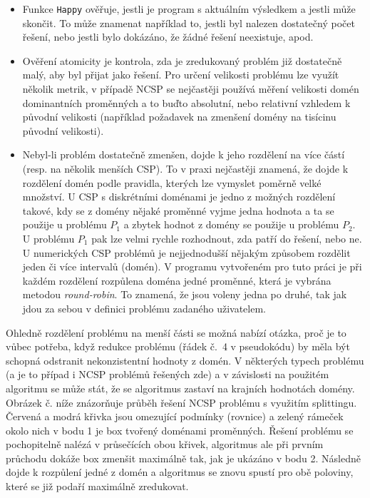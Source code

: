 \begin{itemize}
    \item Funkce \verb|Happy| ověřuje, jestli je program  s aktuálním výsledkem a jestli může skončit. To může znamenat například to, jestli byl nalezen dostatečný počet řešení, nebo jestli bylo dokázáno, že žádné řešení neexistuje, apod.
    \item Ověření atomicity je kontrola, zda je zredukovaný problém již dostatečně malý, aby byl přijat jako řešení. Pro určení velikosti problému lze využít několik metrik, v případě NCSP se nejčastěji používá měření velikosti domén dominantních proměnných a to buďto absolutní, nebo relativní vzhledem k původní velikosti (například požadavek na zmenšení domény na tisícinu původní velikosti).
    \item Nebyl-li problém dostatečně zmenšen, dojde k jeho rozdělení na více částí (resp. na několik menších CSP). To v praxi nejčastěji znamená, že dojde k rozdělení domén podle pravidla, kterých lze vymyslet poměrně velké množství. U CSP s diskrétními doménami je jedno z možných rozdělení takové, kdy se z domény nějaké proměnné vyjme jedna hodnota a ta se použije u problému $P_1$ a zbytek hodnot z domény se použije u problému $P_2$. U problému $P_1$ pak lze velmi rychle rozhodnout, zda patří do řešení, nebo ne. U numerických CSP problémů je nejjednodušší nějakým způsobem rozdělit jeden či více intervalů (domén). V programu vytvořeném pro tuto práci je při každém rozdělení rozpůlena doména jedné proměnné, která je vybrána metodou \emph{round-robin}. To znamená, že jsou voleny jedna po druhé, tak jak jdou za sebou v definici problému zadaného uživatelem.
\end{itemize}

Ohledně rozdělení problému na menší části se možná nabízí otázka, proč je to vůbec potřeba, když redukce problému (řádek č.~4 v pseudokódu) by měla být schopná odstranit nekonzistentní hodnoty z domén. V některých typech problému (a je to případ i NCSP problémů řešených zde) a v závislosti na použitém algoritmu se může stát, že se algoritmus zastaví na krajních hodnotách domény. Obrázek č. níže znázorňuje průběh řešení NCSP problému s využitím splittingu. Červená a modrá křivka jsou omezující podmínky (rovnice) a zelený rámeček okolo nich v bodu 1 je box tvořený doménami proměnných. Řešení problému se pochopitelně nalézá v průsečících obou křivek, algoritmus ale při prvním průchodu dokáže box zmenšit maximálně tak, jak je ukázáno v bodu 2. Následně dojde k rozpůlení jedné z domén a algoritmus se znovu spustí pro obě poloviny, které se již podaří maximálně zredukovat.

